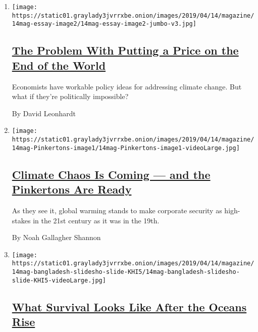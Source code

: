 \begin{enumerate}
\def\labelenumi{\arabic{enumi}.}
\item
  \texttt{[image: https://static01.graylady3jvrrxbe.onion/images/2019/04/14/magazine/14mag-essay-image2/14mag-essay-image2-jumbo-v3.jpg]}

  \hypertarget{the-problem-with-putting-a-price-on-the-end-of-the-world}{%
  \subsection{\texorpdfstring{\href{/interactive/2019/04/09/magazine/climate-change-politics-economics.html}{The
  Problem With Putting a Price on the End of the
  World}}{The Problem With Putting a Price on the End of the World}}\label{the-problem-with-putting-a-price-on-the-end-of-the-world}}

  Economists have workable policy ideas for addressing climate change.
  But what if they're politically impossible?

  By David Leonhardt
\item
  \texttt{[image: https://static01.graylady3jvrrxbe.onion/images/2019/04/14/magazine/14mag-Pinkertons-image1/14mag-Pinkertons-image1-videoLarge.jpg]}

  \hypertarget{climate-chaos-is-coming--and-the-pinkertons-are-ready}{%
  \subsection{\texorpdfstring{\href{/interactive/2019/04/10/magazine/climate-change-pinkertons.html}{Climate
  Chaos Is Coming --- and the Pinkertons Are
  Ready}}{Climate Chaos Is Coming --- and the Pinkertons Are Ready}}\label{climate-chaos-is-coming--and-the-pinkertons-are-ready}}

  As they see it, global warming stands to make corporate security as
  high-stakes in the 21st century as it was in the 19th.

  By Noah Gallagher Shannon
\item
  \texttt{[image: https://static01.graylady3jvrrxbe.onion/images/2019/04/14/magazine/14mag-bangladesh-slidesho-slide-KHI5/14mag-bangladesh-slidesho-slide-KHI5-videoLarge.jpg]}

  \hypertarget{what-survival-looks-like-after-the-oceans-rise}{%
  \subsection{\texorpdfstring{\href{/interactive/2019/04/11/magazine/climate-change-bangladesh-scavenging.html}{What
  Survival Looks Like After the Oceans
  Rise}}{What Survival Looks Like After the Oceans Rise}}\label{what-survival-looks-like-after-the-oceans-rise}}


\end{enumerate}
